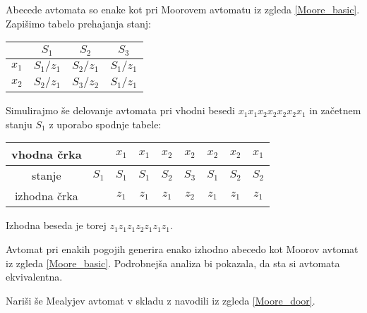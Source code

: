 \begin{resitev}

Abecede avtomata so enake kot pri Moorovem avtomatu iz zgleda \ref{Moore_basic}. Zapišimo tabelo prehajanja stanj:

\begin{center}
\begin{tabular}{c|ccc}
& $S_1$ & $S_2$ & $S_3$\\
\hline
$x_1$ & $S_1/z_1$ & $S_2/z_1$ & $S_1/z_1$\\
$x_2$ & $S_2/z_1$ & $S_3/z_2$ & $S_1/z_1$
\end{tabular}
\end{center}


\bigskip

Simulirajmo še delovanje avtomata pri vhodni besedi $x_1 x_1 x_2 x_2 x_2 x_2 x_1$ in začetnem stanju $S_1$ z uporabo spodnje tabele:

\bigskip

\begin{center}
\begin{tabular}{c|cccccccc}
vhodna črka 	&				& $x_1$ & $x_1$ & $x_2$ & $x_2$ & $x_2$ & $x_2$ & $x_1$ \\
\hline
stanje 				& $S_1$ & $S_1$ & $S_1$ & $S_2$ & $S_3$ & $S_1$ & $S_2$ & $S_2$ \\
\hline
izhodna črka	&				& $z_1$ & $z_1$ & $z_1$ & $z_2$ & $z_1$ & $z_1$ & $z_1$ 
\end{tabular}
\end{center}

\bigskip

Izhodna beseda je torej $z_1z_1z_1z_2z_1z_1z_1$.

\bigskip

Avtomat pri enakih pogojih generira enako izhodno abecedo kot Moorov avtomat iz zgleda \ref{Moore_basic}. Podrobnejša analiza bi pokazala, da sta si avtomata ekvivalentna.

\bigskip

\end{resitev}


\begin{zgled}
Nariši še Mealyjev avtomat v skladu z navodili iz zgleda \ref{Moore_door}.



\end{zgled}

